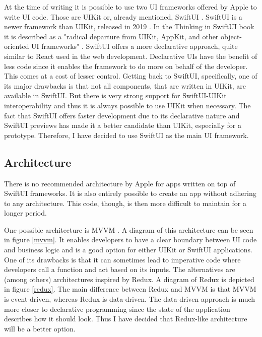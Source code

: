 At the time of writing it is possible to use two UI frameworks offered by Apple to write UI code. Those are UIKit \cite{uikit} or, already mentioned, SwiftUI \cite{swiftui}. SwiftUI is a newer framework than UIKit, released in 2019 \cite{swiftui-release}. In the Thinking in SwiftUI book it is described as a "radical departure from UIKit, AppKit, and other object-oriented UI frameworks" \cite{thinking-in-swiftui}. SwiftUI offers a more declarative approach, quite similar to React \cite{react} used in the web development. Declarative UIs have the benefit of less code since it enables the framework to do more on behalf of the developer. This comes at a cost of lesser control. Getting back to SwiftUI, specifically, one of its major drawbacks is that not all components, that are written in UIKit, are available in SwiftUI. But there is very strong support for SwiftUI-UIKit interoperability \cite{swiftui-interop} and thus it is always possible to use UIKit when necessary. The fact that SwiftUI offers faster development due to its declarative nature and SwiftUI previews \cite{swiftui-preview} has made it a better candidate than UIKit, especially for a prototype. Therefore, I have decided to use SwiftUI as the main UI framework.

\subsection{Architecture}

There is no recommended architecture by Apple for apps written on top of SwiftUI frameworks. It is also entirely possible to create an app without adhering to any architecture. This code, though, is then more difficult to maintain for a longer period.

One possible architecture is MVVM \cite{mvvm}. A diagram of this architecture can be seen in figure \ref{mvvm}. It enables developers to have a clear boundary between UI code and business logic and is a good option for either UIKit or SwiftUI applications. One of its drawbacks is that it can sometimes lead to imperative code where developers call a function and act based on its inputs. The alternatives are (among others) architectures inspired by Redux. A diagram of Redux is depicted in figure \ref{redux}. The main difference between Redux and MVVM is that MVVM is event-driven, whereas Redux is data-driven. The data-driven approach is much more closer to declarative programming since the state of the application describes how it should look. Thus I have decided that Redux-like architecture will be a better option.

